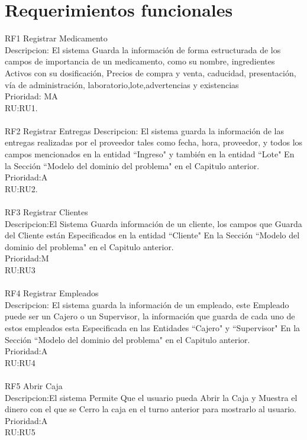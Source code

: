 \section{Requerimientos funcionales}
RF1 Registrar Medicamento\\
Descripcion: El sistema Guarda la información de forma estructurada de los campos de importancia de un medicamento, como su nombre, ingredientes Activos con su dosificación, Precios de compra y venta, caducidad, presentación, vía de administración, laboratorio,lote,advertencias y existencias\\
Prioridad: MA\\
RU:RU1.\\
\\
RF2 Registrar Entregas 
Descripcion: El sistema guarda la información de las entregas realizadas por el proveedor tales como fecha, hora, proveedor, y todos los campos mencionados en la entidad ``Ingreso" y también en la entidad ``Lote" En la Sección ``Modelo del dominio del problema" en el  Capitulo anterior.\\
Prioridad:A\\
RU:RU2.\\
\\
RF3 Registrar Clientes\\
Descripcion:El Sistema Guarda información de un cliente, los campos que Guarda del Cliente están Especificados en la entidad ``Cliente" En la Sección ``Modelo del dominio del problema" en el  Capitulo anterior.\\
Prioridad:M\\
RU:RU3\\
\\
RF4 Registrar Empleados\\
Descripcion: El sistema guarda la información de un empleado, este Empleado puede ser un Cajero o un Supervisor, la información que guarda de cada uno de estos empleados esta Especificada en las Entidades ``Cajero" y ``Supervisor" En la Sección ``Modelo del dominio del problema" en el  Capitulo anterior.\\
Prioridad:A\\
RU:RU4\\
\\
RF5 Abrir Caja\\
Descripcion:El sistema Permite Que el usuario pueda Abrir la Caja y Muestra el dinero con el que se Cerro la caja en el turno anterior para mostrarlo al usuario.
\\
Prioridad:A\\
RU:RU5
\\
